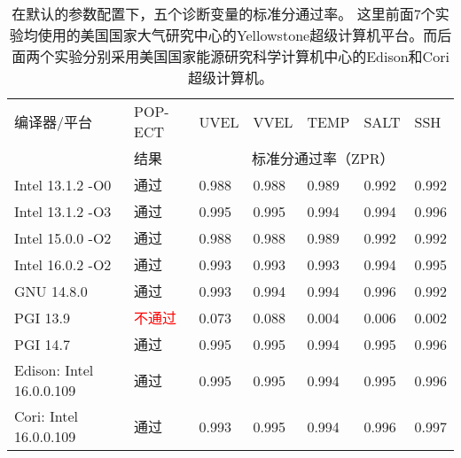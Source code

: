 \begin{table}[!ht]
\caption{在默认的参数配置下，五个诊断变量的标准分通过率。 这里前面7个实验均使用的美国国家大气研究中心的Yellowstone超级计算机平台。而后面两个实验分别采用美国国家能源研究科学计算机中心的Edison和Cori超级计算机。}
\begin{center}
\begin{footnotesize}
\begin{tabular}{lllllll}
\hline \hline
编译器/平台  & POP-ECT & UVEL & VVEL & TEMP & SALT & SSH\\
 &结果 & \multicolumn{5}{c}{标准分通过率（ZPR）}\\
 \hline \hline
Intel 13.1.2 -O0 &  通过  & 0.988 & 0.988 & 0.989 & 0.992 & 0.992\\
Intel 13.1.2 -O3  &  通过  &  0.995 & 0.995 & 0.994 & 0.994 & 0.996 \\
\hline
Intel 15.0.0 -O2  &  通过  & 0.988 & 0.988 & 0.989 & 0.992 & 0.992 \\
Intel 16.0.2 -O2  &  通过  & 0.993 & 0.993 & 0.993 & 0.994 & 0.995 \\
\hline
GNU 14.8.0 & 通过 & 0.993 & 0.994 & 0.994 & 0.996 & 0.992 \\ 
PGI 13.9 & \textcolor{red}{不通过} & 0.073 & 0.088 & 0.004 & 0.006 & 0.002 \\
\hline
PGI 14.7 & 通过 & 0.995 & 0.995 & 0.994 & 0.995 & 0.996 \\
\hline
Edison: Intel 16.0.0.109  & 通过  & 0.995 & 0.995 & 0.994 & 0.995 & 0.996 \\
Cori: Intel 16.0.0.109  &  通过 & 0.993 & 0.995 & 0.994 & 0.996 & 0.997\\
\hline \hline
\end{tabular}
\end{footnotesize}
\end{center}
\label{verify:zpr}
\end{table}

 


